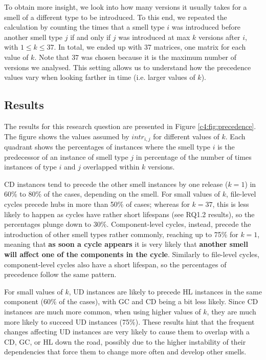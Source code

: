 To obtain more insight, we look into how many versions it usually takes for a smell of a different type to be introduced. To this end, we repeated the calculation by counting the times that a smell type $i$ was introduced before another smell type $j$ if and only if $j$ was introduced at max $k$ versions after $i$, with $1\le k \le 37$. In total, we ended up with 37 matrices, one matrix for each value of $k$. Note that $37$ was chosen because it is the maximum number of versions we analysed. 
This setting allows us to understand how the precedence values vary when looking farther in time (i.e. larger values of $k$).

\subsection{Results}
The results for this research question are presented in Figure \ref{c4:fig:precedence}.
The figure shows the values assumed by $intr_{i,j}$ for different values of $k$. Each quadrant shows the percentages of instances where the smell type $i$ is the predecessor of an instance of smell type $j$ in percentage of the number of times instances of type $i$ and $j$ overlapped within $k$ versions.

CD instances tend to precede the other smell instances by one release ($k = 1$) in 60\% to 80\% of the cases, depending on the smell. For small values of $k$, file-level cycles precede hubs in more than 50\% of cases; whereas for $k = 37$, this is less likely to happen as cycles have rather short lifespans (see RQ1.2 results), so the percentages plunge down to 30\%.
Component-level cycles, instead, precede the introduction of other smell types rather commonly, reaching up to 75\% for $k = 1$, meaning that \textbf{as soon a cycle appears} it is very likely that \textbf{another smell will affect one of the components in the cycle}.
Similarly to file-level cycles, component-level cycles also have a short lifespan, so the percentages of precedence follow the same pattern.

For small values of $k$, UD instances are likely to precede HL instances in the same component (60\% of the cases), with GC and CD being a bit less likely.
Since CD instances are much more common, when using higher values of $k$, they are much more likely to succeed UD instances (75\%).
These results hint that the frequent changes affecting UD instances are very likely to cause them to overlap with a CD, GC, or HL down the road, possibly due to the higher instability of their dependencies that force them to change more often and develop other smells.

